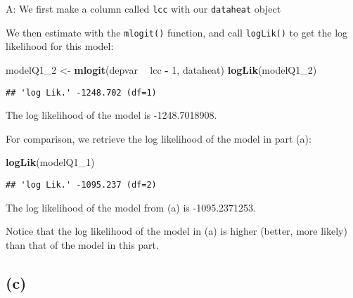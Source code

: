\documentclass[
]{article}
\newenvironment{Shaded}{\begin{snugshade}}{\end{snugshade}}
\newcommand{\DecValTok}[1]{\textcolor[rgb]{0.00,0.00,0.81}{#1}}
\newcommand{\FloatTok}[1]{\textcolor[rgb]{0.00,0.00,0.81}{#1}}
\newcommand{\KeywordTok}[1]{\textcolor[rgb]{0.13,0.29,0.53}{\textbf{#1}}}
\newcommand{\NormalTok}[1]{#1}
\newcommand{\OperatorTok}[1]{\textcolor[rgb]{0.81,0.36,0.00}{\textbf{#1}}}
\newcommand{\StringTok}[1]{\textcolor[rgb]{0.31,0.60,0.02}{#1}}
\begin{document}
A: We first make a column called \texttt{lcc} with our \texttt{dataheat}
object

\begin{Shaded}
\end{Shaded}

We then estimate with the \texttt{mlogit()} function, and call
\texttt{logLik()} to get the log likelihood for this model:

\begin{Shaded}
\begin{Highlighting}[]
\NormalTok{modelQ1_}\DecValTok{2}\NormalTok{ <-}\StringTok{ }\KeywordTok{mlogit}\NormalTok{(depvar }\OperatorTok{~}\StringTok{ }\NormalTok{lcc }\OperatorTok{-}\StringTok{ }\DecValTok{1}\NormalTok{, dataheat)}
\KeywordTok{logLik}\NormalTok{(modelQ1_}\DecValTok{2}\NormalTok{)}
\end{Highlighting}
\end{Shaded}

\begin{verbatim}
## 'log Lik.' -1248.702 (df=1)
\end{verbatim}

The log likelihood of the model is -1248.7018908.

For comparison, we retrieve the log likelihood of the model in part (a):

\begin{Shaded}
\begin{Highlighting}[]
\KeywordTok{logLik}\NormalTok{(modelQ1_}\DecValTok{1}\NormalTok{)}
\end{Highlighting}
\end{Shaded}

\begin{verbatim}
## 'log Lik.' -1095.237 (df=2)
\end{verbatim}

The log likelihood of the model from (a) is -1095.2371253.

Notice that the log likelihood of the model in (a) is higher (better,
more likely) than that of the model in this part.

\hypertarget{onec}{%
\subsection{(c)}\label{onec}}
\end{document}
